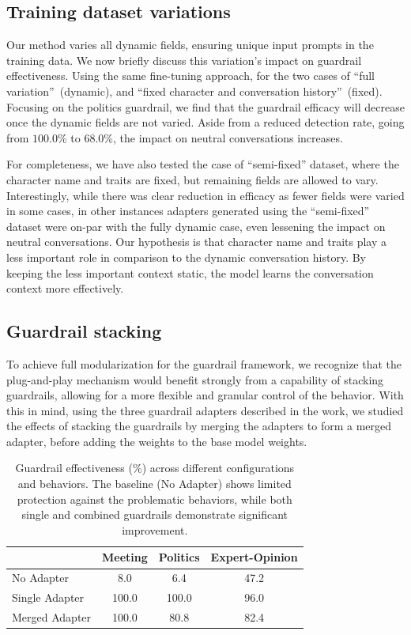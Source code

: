 \documentclass[letterpaper]{article}
\newcommand{\tagDetectionPoliticsFixed}{68.0}
\newcommand{\baselineMeeting}{8.0}
\newcommand{\baselinePolitics}{6.4}
\newcommand{\baselineExpert}{47.2}
\newcommand{\singleAdapterMeetingLora}{100.0}
\newcommand{\singleAdapterPoliticsLora}{100.0}
\newcommand{\singleAdapterExpertLora}{96.0}
\newcommand{\tagDetectionPolitics}{100.0}
\newcommand{\guardrailMergedEfficiencyMeeting}{100.0}
\newcommand{\guardrailMergedEfficiencyPolitics}{80.8}
\newcommand{\guardrailMergedEfficiencyExpert}{82.4}
\begin{document}
\subsection{Training dataset variations}
Our method varies all dynamic fields, ensuring unique input prompts in the training data. We now briefly discuss this variation's impact on guardrail effectiveness. 
Using the same fine-tuning approach, for the two cases of ``full variation''~(dynamic),  and ``fixed character and conversation history''~(fixed). 
Focusing on the politics guardrail, we find that the guardrail efficacy will decrease once the dynamic fields are not varied. Aside from a reduced detection rate, going from $\tagDetectionPolitics$\% to $\tagDetectionPoliticsFixed$\%, the impact on neutral conversations increases.

For completeness, we have also tested the case of ``semi-fixed'' dataset, where the character name and traits are fixed, but remaining fields are allowed to vary. 
Interestingly, while there was clear reduction in efficacy as fewer fields were varied in some cases, in other instances adapters generated using the ``semi-fixed'' dataset were on-par with the fully dynamic case, even lessening the impact on neutral conversations.
Our hypothesis is that character name and traits play a less important role in comparison to the dynamic conversation history. By keeping the less important context static, the model learns the conversation context more effectively.

\subsection{Guardrail stacking}
To achieve full modularization for the guardrail framework, we recognize that the plug-and-play mechanism would benefit strongly from a capability of stacking guardrails, allowing for a more flexible and granular control of the behavior. 
With this in mind, using the three guardrail adapters described in the work, we studied the effects of stacking the guardrails by merging the adapters to form a merged adapter, before adding the weights to the base model weights. 

\begin{table}[ht]
	\centering
	\begin{tabular}{lccc}
		\toprule
		& Meeting & Politics & Expert-Opinion \\
		\midrule
		No Adapter & \baselineMeeting& \baselinePolitics& \baselineExpert\\
		Single Adapter & \singleAdapterMeetingLora& \singleAdapterPoliticsLora& \singleAdapterExpertLora\\
		Merged Adapter & \guardrailMergedEfficiencyMeeting& \guardrailMergedEfficiencyPolitics& \guardrailMergedEfficiencyExpert\\
		\bottomrule
	\end{tabular}
	\caption{Guardrail effectiveness (\%) across different configurations and behaviors. The baseline (No Adapter) shows limited protection against the problematic behaviors, while both single and combined guardrails demonstrate significant improvement.}\label{tab:guardrail-effectiveness}
\end{table}
\end{document}
